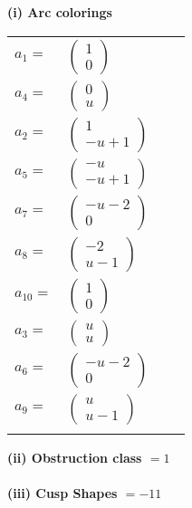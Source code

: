 \documentclass[1p]{elsarticle_modified}
\theoremstyle{definition}
\begin{document}
\flushleft \textbf{(i) Arc colorings}\\
\begin{tabular}{m{7pt} m{180pt} m{7pt} m{180pt} }
\flushright $a_{1}=$&$\begin{pmatrix}1\\0\end{pmatrix}$ \\
\flushright $a_{4}=$&$\begin{pmatrix}0\\u\end{pmatrix}$ \\
\flushright $a_{2}=$&$\begin{pmatrix}1\\- u+1\end{pmatrix}$ \\
\flushright $a_{5}=$&$\begin{pmatrix}- u\\- u+1\end{pmatrix}$ \\
\flushright $a_{7}=$&$\begin{pmatrix}- u-2\\0\end{pmatrix}$ \\
\flushright $a_{8}=$&$\begin{pmatrix}-2\\u-1\end{pmatrix}$ \\
\flushright $a_{10}=$&$\begin{pmatrix}1\\0\end{pmatrix}$ \\
\flushright $a_{3}=$&$\begin{pmatrix}u\\u\end{pmatrix}$ \\
\flushright $a_{6}=$&$\begin{pmatrix}- u-2\\0\end{pmatrix}$ \\
\flushright $a_{9}=$&$\begin{pmatrix}u\\u-1\end{pmatrix}$\\&\end{tabular}
\flushleft \textbf{(ii) Obstruction class $= 1$}\\~\\
\flushleft \textbf{(iii) Cusp Shapes $= -11$}\\~\\
\end{document}
